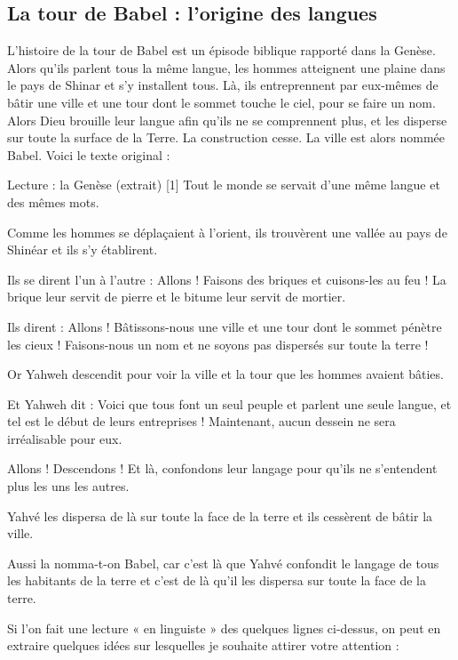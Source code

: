 \subsection{La tour de Babel : l’origine des langues}
L’histoire de la tour de Babel est un épisode biblique rapporté dans la Genèse. Alors qu’ils parlent tous la même langue, les hommes atteignent une plaine dans le pays de Shinar et s’y installent tous. Là, ils entreprennent par eux-mêmes de bâtir une ville et une tour dont le sommet touche le ciel, pour se faire un nom. Alors Dieu brouille leur langue afin qu’ils ne se comprennent plus, et les disperse sur toute la surface de la Terre. La construction cesse. La ville est alors nommée Babel. Voici le texte original :

\begin{lecture}{Lecture : la Genèse (extrait)}
[1] Tout le monde se servait d’une même langue et des mêmes mots.\par
[2] Comme les hommes se déplaçaient à l’orient, ils trouvèrent une vallée au pays de Shinéar et ils s’y établirent.\par
[3] Ils se dirent l’un à l’autre : Allons ! Faisons des briques et cuisons-les au feu ! La brique leur servit de pierre et le bitume leur servit de mortier.\par
[4] Ils dirent : Allons ! Bâtissons-nous une ville et une tour dont le sommet pénètre les cieux ! Faisons-nous un nom et ne soyons pas dispersés sur toute la terre !\par
[5] Or Yahweh descendit pour voir la ville et la tour que les hommes avaient bâties.\par
[6] Et Yahweh dit : Voici que tous font un seul peuple et parlent une seule langue, et tel est le début de leurs entreprises ! Maintenant, aucun dessein ne sera irréalisable pour eux.\par
[7] Allons ! Descendons ! Et là, confondons leur langage pour qu’ils ne s’entendent plus les uns les autres.\par
[8] Yahvé les dispersa de là sur toute la face de la terre et ils cessèrent de bâtir la ville.\par
[9] Aussi la nomma-t-on Babel, car c’est là que Yahvé confondit le langage de tous les habitants de la terre et c’est de là qu’il les dispersa sur toute la face de la terre.
\end{lecture}
Si l’on fait une lecture « en linguiste » des quelques lignes ci-dessus, on peut en extraire quelques idées sur lesquelles je souhaite attirer votre attention :
